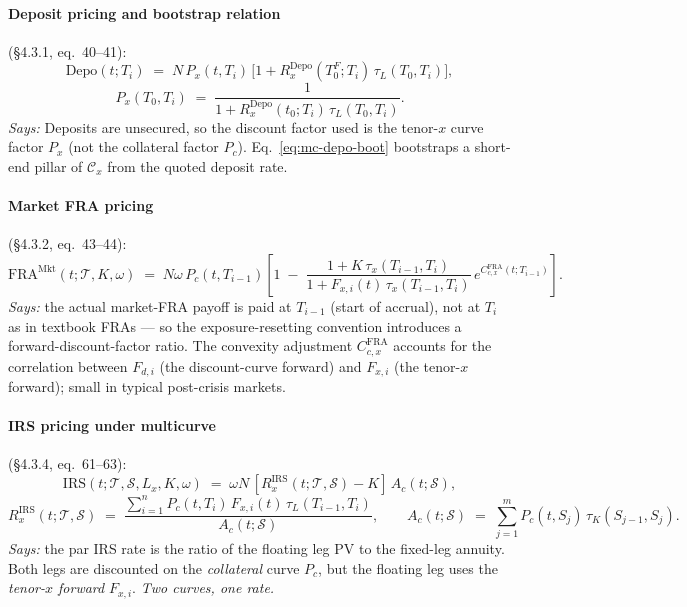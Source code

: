 \documentclass[11pt,a4paper]{article}
\begin{document}
\paragraph{Deposit pricing and bootstrap relation} (\S4.3.1, eq.~40--41):
\begin{equation}\label{eq:mc-depo}
  \text{Depo}(t; T_i) \;=\; N\, P_x(t, T_i)\, \bigl[ 1 + R^{\text{Depo}}_x(T^F_0; T_i)\, \tau_L(T_0, T_i) \bigr],
\end{equation}
\begin{equation}\label{eq:mc-depo-boot}
  P_x(T_0, T_i) \;=\; \frac{1}{1 + R^{\text{Depo}}_x(t_0; T_i)\, \tau_L(T_0, T_i)}.
\end{equation}
\textit{Says:} Deposits are unsecured, so the discount factor used
is the tenor-$x$ curve factor $P_x$ (not the collateral factor
$P_c$). Eq.~\ref{eq:mc-depo-boot} bootstraps a short-end pillar of
$\mathcal{C}_x$ from the quoted deposit rate.

\paragraph{Market FRA pricing} (\S4.3.2, eq.~43--44):
\begin{equation}\label{eq:mc-fra}
  \text{FRA}^{\text{Mkt}}(t; \mathcal{T}, K, \omega)
  \;=\; N \omega\, P_c(t, T_{i-1})
        \left[ 1 \;-\; \frac{1 + K\, \tau_x(T_{i-1}, T_i)}{1 + F_{x,i}(t)\, \tau_x(T_{i-1}, T_i)}\, e^{C^{\text{FRA}}_{c,x}(t; T_{i-1})} \right].
\end{equation}
\textit{Says:} the actual market-FRA payoff is paid at $T_{i-1}$
(start of accrual), not at $T_i$ as in textbook FRAs --- so the
exposure-resetting convention introduces a forward-discount-factor
ratio. The convexity adjustment $C^{\text{FRA}}_{c,x}$ accounts for
the correlation between $F_{d,i}$ (the discount-curve forward) and
$F_{x,i}$ (the tenor-$x$ forward); small in typical post-crisis
markets.

\paragraph{IRS pricing under multicurve} (\S4.3.4, eq.~61--63):
\begin{equation}\label{eq:mc-irs}
  \text{IRS}(t; \mathcal{T}, \mathcal{S}, L_x, K, \omega) \;=\; \omega N\, [R^{\text{IRS}}_x(t; \mathcal{T}, \mathcal{S}) - K]\, A_c(t; \mathcal{S}),
\end{equation}
\begin{equation}\label{eq:mc-irs-rate}
  R^{\text{IRS}}_x(t; \mathcal{T}, \mathcal{S})
  \;=\; \frac{\sum_{i=1}^{n} P_c(t, T_i)\, F_{x,i}(t)\, \tau_L(T_{i-1}, T_i)}{A_c(t; \mathcal{S})},
  \qquad
  A_c(t; \mathcal{S}) \;=\; \sum_{j=1}^{m} P_c(t, S_j)\, \tau_K(S_{j-1}, S_j).
\end{equation}
\textit{Says:} the par IRS rate is the ratio of the floating leg PV
to the fixed-leg annuity. Both legs are discounted on the
\emph{collateral} curve $P_c$, but the floating leg uses the
\emph{tenor-$x$ forward} $F_{x,i}$. \emph{Two curves, one rate.}
\end{document}
